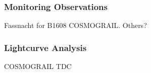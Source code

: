 


\subsubsection{Monitoring Observations}




Fassnacht for B1608
COSMOGRAIL.
Others?


\subsubsection{Lightcurve Analysis}



COSMOGRAIL
TDC
